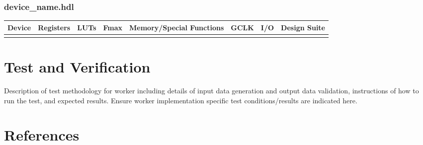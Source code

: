 \documentclass{article}
\def\comp{device\_name}
\begin{document}
\subsubsection*{\comp.hdl}
\begin{scriptsize}
	\begin{tabular}{|c|c|c|c|c|c|c|c|}
		\hline
		\rowcolor{blue}
		Device & Registers & LUTs & Fmax & Memory/Special Functions & GCLK & I/O & Design Suite \\
		\hline
		       &           &      &      &                          &      &     &              \\
		\hline
	\end{tabular}
\end{scriptsize}

\section*{Test and Verification}
\begin{flushleft}
	Description of test methodology for worker including details of input data generation and output data validation, instructions of how to run the test, and expected results. Ensure worker implementation specific test conditions/results are indicated here.
\end{flushleft}
\section*{References}
\begin{flushleft}
\end{flushleft}
\end{document}
